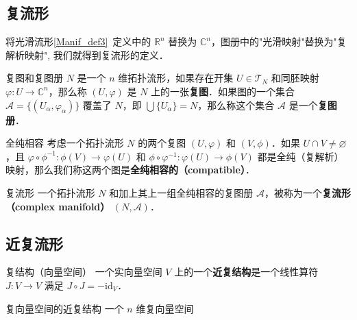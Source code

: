

\subsection{复流形}

将光滑流形\autoref{Manif_def3}~定义中的 $\mathbb{R}^n$ 替换为 $\mathbb{C}^n$，图册中的"光滑映射"替换为"复解析映射", 我们就得到复流形的定义．

\begin{definition}{复图和复图册}
$N$ 是一个 $n$ 维拓扑流形，如果存在开集 $U \in \mathcal{T}_N$ 和同胚映射 $\varphi: U \rightarrow \mathbb{C}^n$，那么称 $(U,\varphi)$ 是 $N$ 上的一张\textbf{复图}．如果图的一个集合 $\mathcal{A}=\{(U_\alpha, \varphi_\alpha)\}$ 覆盖了 $N$，即 $\bigcup\{U_\alpha\}=N$，那么称这个集合 $\mathcal{A}$ 是一个\textbf{复图册}．
\end{definition}


\begin{definition}{全纯相容}
考虑一个拓扑流形 $N$ 的两个复图 $(U, \varphi)$ 和 $(V, \phi)$．如果 $U \cap V \neq \varnothing$，且 $\varphi \circ \phi^{-1}: \phi(V) \rightarrow \varphi(U)$ 和 $\phi \circ \varphi^{-1}: \varphi(U) \rightarrow \phi(V)$ 都是全纯（复解析）映射，那么我们称这两个图是\textbf{全纯相容的（compatible）}．
\end{definition}

\begin{definition}{复流形}
一个拓扑流形 $N$ 和加上其上一组全纯相容的复图册 $\mathcal{A}$，被称为一个\textbf{复流形（complex manifold）} $(N, \mathcal{A})$．
\end{definition}


\subsection{近复流形}

\begin{definition}{复结构（向量空间）}
一个实向量空间 $V$ 上的一个\textbf{近复结构}是一个线性算符 $J: V \to V$ 满足 $J \circ J = - \text{id}_V$．
\end{definition}

\begin{theorem}{复向量空间的近复结构}
一个 $n$ 维复向量空间
\end{theorem}


